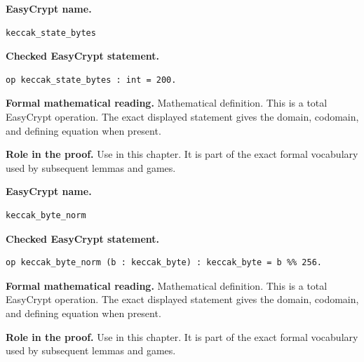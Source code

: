 \begin{formaldefinition}
\noindent\textbf{EasyCrypt name.}
\begin{lstlisting}[language=EasyCrypt,basicstyle=\ttfamily\scriptsize]
keccak_state_bytes
\end{lstlisting}
\noindent\textbf{Checked EasyCrypt statement.}
\begin{lstlisting}[language=EasyCrypt,basicstyle=\ttfamily\scriptsize]
op keccak_state_bytes : int = 200.
\end{lstlisting}
\noindent\textbf{Formal mathematical reading.}
Mathematical definition. This is a total EasyCrypt operation.  The exact displayed statement gives the domain, codomain, and defining equation when present.

\noindent\textbf{Role in the proof.}
Use in this chapter. It is part of the exact formal vocabulary used by subsequent lemmas and games.

\end{formaldefinition}

\begin{formaldefinition}
\noindent\textbf{EasyCrypt name.}
\begin{lstlisting}[language=EasyCrypt,basicstyle=\ttfamily\scriptsize]
keccak_byte_norm
\end{lstlisting}
\noindent\textbf{Checked EasyCrypt statement.}
\begin{lstlisting}[language=EasyCrypt,basicstyle=\ttfamily\scriptsize]
op keccak_byte_norm (b : keccak_byte) : keccak_byte = b %% 256.
\end{lstlisting}
\noindent\textbf{Formal mathematical reading.}
Mathematical definition. This is a total EasyCrypt operation.  The exact displayed statement gives the domain, codomain, and defining equation when present.

\noindent\textbf{Role in the proof.}
Use in this chapter. It is part of the exact formal vocabulary used by subsequent lemmas and games.

\end{formaldefinition}

